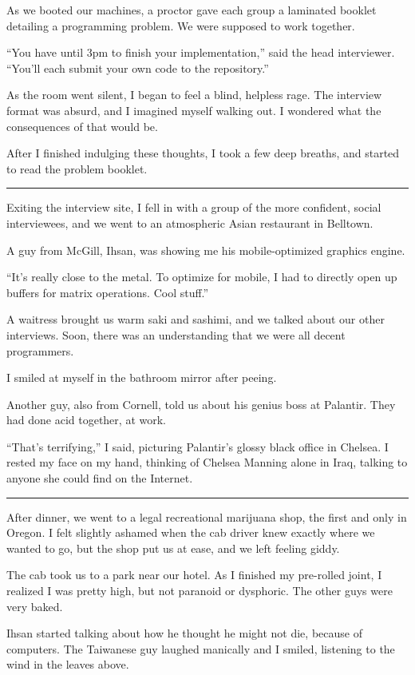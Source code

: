 As we booted our machines, a proctor gave each group a laminated booklet
detailing a programming problem.  We were supposed to work together.

``You have until 3pm to finish your implementation,'' said the head interviewer.
``You'll each submit your own code to the repository.''

As the room went silent, I began to feel a blind, helpless rage.  The interview
format was absurd, and I imagined myself walking out.  I wondered what the
consequences of that would be.

After I finished indulging these thoughts, I took a few deep breaths, and
started to read the problem booklet.

\plainfancybreak{12pt}{2}{}

Exiting the interview site, I fell in with a group of the more confident, social
interviewees, and we went to an atmospheric Asian restaurant in Belltown.

A guy from McGill, Ihsan, was showing me his mobile-optimized graphics engine.

``It's really close to the metal.  To optimize for mobile, I had to directly
open up buffers for matrix operations.  Cool stuff.''

A waitress brought us warm saki and sashimi, and we talked about our other
interviews.  Soon, there was an understanding that we were all decent
programmers.

I smiled at myself in the bathroom mirror after peeing.

Another guy, also from Cornell, told us about his genius boss at Palantir.  They
had done acid together, at work.

``That's terrifying,'' I said, picturing Palantir's glossy black office in
Chelsea.  I rested my face on my hand, thinking of Chelsea Manning alone in
Iraq, talking to anyone she could find on the Internet.

\plainfancybreak{12pt}{2}{}

After dinner, we went to a legal recreational marijuana shop, the first and only
in Oregon.  I felt slightly ashamed when the cab driver knew exactly where we
wanted to go, but the shop put us at ease, and we left feeling giddy.

The cab took us to a park near our hotel.  As I finished my pre-rolled joint, I
realized I was pretty high, but not paranoid or dysphoric.   The other guys were
very baked.

Ihsan started talking about how he thought he might not die, because of
computers.  The Taiwanese guy laughed manically and I smiled, listening to the
wind in the leaves above.

